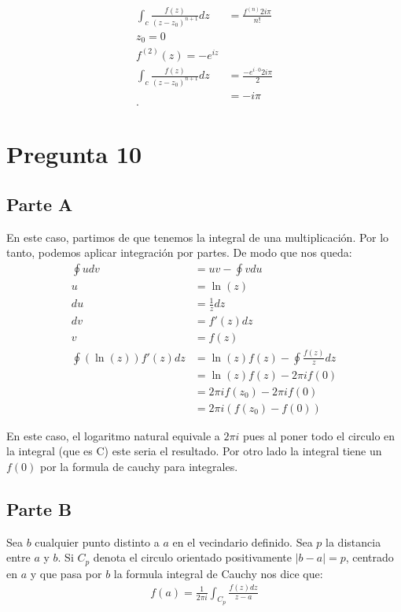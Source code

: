\documentclass[12pt]{exam}
\begin{document}
\begin{align*}
  \int_c \frac{f(z)}{\left( z - z_0 \right)^{n+1}}dz &= \frac{f^{\left( n \right) }2i\pi}{n!}\\
  z_0 = 0\\
  f^{(2)}\left( z \right) = -e^{iz}\\
  \int_c \frac{f(z)}{\left( z - z_0 \right)^{n+1}}dz &= \frac{-e^{i\cdot 0}2i\pi}{2} \\
  &= -i\pi \\
.\end{align*}

\section*{Pregunta 10}

\subsection*{Parte A}

En este caso, partimos de que tenemos la integral de una multiplicación. Por lo tanto, podemos aplicar integración por partes. De modo que nos queda:
\begin{align*}
	\oint u dv &= uv - \oint vdu\\
	u &= \ln(z)\\
	du &= \frac{1}{z} dz\\
	dv &= f'(z) dz\\
	v &= f(z) \\
	\oint \left(\ln(z)\right)f'(z)dz &= \ln(z)f(z) - \oint \frac{f(z)}{z}dz\\
	&= \ln(z)f(z) - 2\pi i f(0)\\
	&= 2\pi i f(z_0) - 2 \pi i f(0)\\
	&= 2\pi i (f(z_0) - f(0))
\end{align*}

En este caso, el logaritmo natural equivale a $2\pi i$ pues al poner todo el circulo en la integral (que es C) este seria el resultado. Por otro lado la integral tiene un $f(0)$ por la formula de cauchy para integrales.

\subsection*{Parte B}

Sea $b$ cualquier punto distinto a $a$ en el vecindario definido. Sea $p$ la distancia entre $a$ y $b$. Si $C_p$ denota el circulo orientado positivamente $|b - a| = p$, centrado en $a$ y que pasa por $b$ la formula integral de Cauchy nos dice que:
\begin{align*}
	f(a) = \frac{1}{2\pi i}\int_{C_p}\frac{f(z)dz}{z - a}
\end{align*}
\end{document}
